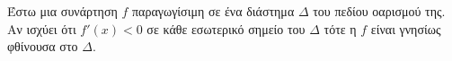 Έστω μια συνάρτηση $ f $ παραγωγίσιμη σε ένα διάστημα $ \Delta $ του πεδίου οαρισμού της. Αν ισχύει ότι $ f'(x)<0 $ σε κάθε εσωτερικό σημείο του $ \Delta $ τότε η $ f $ είναι γνησίως φθίνουσα στο $ \Delta $.
